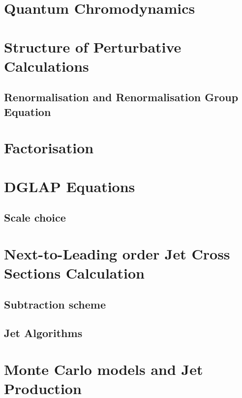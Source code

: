 \section{Quantum Chromodynamics}


\section{Structure of Perturbative Calculations}


\subsection{Renormalisation and Renormalisation Group Equation}


\section{Factorisation}


\section{DGLAP Equations}


\subsection{Scale choice}


\section{Next-to-Leading order Jet Cross Sections Calculation}


\subsection{Subtraction scheme}
\label{subsec:subscheme}

 
\subsection{Jet Algorithms}
\label{subsec:jetalgo}

%

\section{Monte Carlo models and Jet Production}
